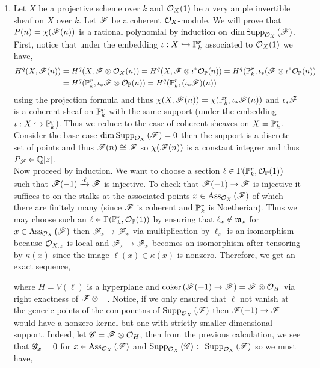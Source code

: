 \documentclass[12pt]{article}
\begin{document}
\begin{enumerate}
\item Let $X$ be a projective scheme over $k$ and $\struct{X}(1)$ be a very ample invertible sheaf on $X$ over $k$. Let $\F$ be a coherent $\struct{X}$-module. We will prove that $P(n) = \chi(\F(n))$ is a rational polynomial by induction on $\dim{\Supp{\struct{X}}{\F}}$. First, notice that under the embedding $\iota : X \embed \P^r_k$ associated to $\struct{X}(1)$ we have,
\begin{align*}
H^q(X, \F(n)) & = H^q(X, \F \otimes \struct{X}(n)) = H^q(X, \F \otimes \iota^* \struct{\P}(n)) = H^q(\P^r_k, \iota_* (\F \otimes \iota^* \struct{\P}(n)) 
\\
& = H^q(\P^r_k, \iota_* \F \otimes \struct{\P}(n)) = H^q(\P^r_k, (\iota_* \F)(n))
\end{align*}
using the projection formula and thus $\chi(X, \F(n)) = \chi(\P^r_k, \iota_* \F(n))$ and $\iota_* \F$ is a coherent sheaf on $\P^r_k$ with the same support (under the embedding $\iota : X \embed \P^r_k$). Thus we reduce to the case of coherent sheaves on $X = \P^r_k$.
\bigskip\\
Consider the base case $\dim{\Supp{\struct{X}}{\F}} = 0$ then the support is a discrete set of points and thus $\F(n) \cong \F$ so $\chi(\F(n))$ is a constant integrer and thus $P_\F \in \Q[z]$. 
\bigskip\\
Now proceed by induction. We want to choose a section $\ell \in \Gamma(\P^r_k, \struct{\P}(1))$ such that $\F(-1) \xrightarrow{\cdot \ell} \F$ is injective. To check that $\F(-1) \to \F$ is injective it suffices to on the stalks at the associated points $x \in \Ass{\struct{X}}{\F}$ of which there are finitely many (since $\F$ is coherent and $\P^r_k$ is Noetherian). Thus we may choose such an $\ell \in \Gamma(\P^r_k, \struct{\P}(1))$ by ensuring that $\ell_x \notin \m_x$ for $x \in \Ass{\struct{X}}{\F}$ then $\F_x \to \F_x$ via multiplication by $\ell_x$ is an isomorphism because $\stalk{X}{x}$ is local and $\F_x \to \F_x$ becomes an isomorphism after tensoring by $\kappa(x)$ since the image $\ell(x) \in \kappa(x)$ is nonzero. Therefore, we get an exact sequence,
\begin{center}
\end{center}
where $H = V(\ell)$ is a hyperplane and $\coker{(\F(-1) \to \F)} = \F \otimes \struct{H}$ via right exactness of $\F \otimes -$. Notice, if we only ensured that $\ell$ not vanish at the generic points of the componetns of $\Supp{\struct{X}}{\F}$ then $\F(-1) \to \F$ would have a nonzero kernel but one with strictly smaller dimensional support. Indeed, let $\G = \F \otimes \struct{H}$, then from the previous calculation, we see that $\G_x = 0$ for $x \in \Ass{\struct{X}}{\F}$ and $\Supp{\struct{X}}{\G} \subset \Supp{\struct{X}}{\F}$ so we must have, 

\end{enumerate}
\end{document}
